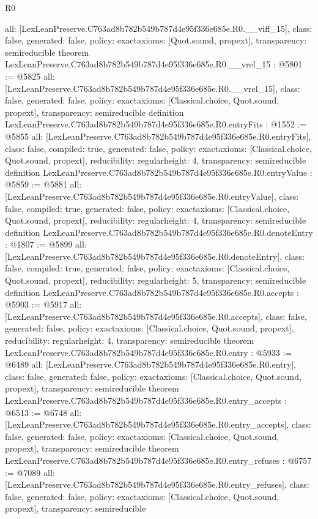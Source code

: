 \begin{lexlean}{R0}
\begin{coremodule}
{  all: [LexLeanPreserve.C763ad8b782b549b787d4e95f336e685e.R0.__viff_15],
  class: false,
  generated: false,
  policy: exact{axioms: [Quot.sound, propext]},
  transparency: semireducible
}
theorem LexLeanPreserve.C763ad8b782b549b787d4e95f336e685e.R0.__vrel_15 : @5801 := @5825 {
  all: [LexLeanPreserve.C763ad8b782b549b787d4e95f336e685e.R0.__vrel_15],
  class: false,
  generated: false,
  policy: exact{axioms: [Classical.choice, Quot.sound, propext]},
  transparency: semireducible
}
definition LexLeanPreserve.C763ad8b782b549b787d4e95f336e685e.R0.entryFits : @1552 := @5855 {
  all: [LexLeanPreserve.C763ad8b782b549b787d4e95f336e685e.R0.entryFits],
  class: false,
  compiled: true,
  generated: false,
  policy: exact{axioms: [Classical.choice, Quot.sound, propext]},
  reducibility: regular{height: 4},
  transparency: semireducible
}
definition LexLeanPreserve.C763ad8b782b549b787d4e95f336e685e.R0.entryValue : @5859 := @5881 {
  all: [LexLeanPreserve.C763ad8b782b549b787d4e95f336e685e.R0.entryValue],
  class: false,
  compiled: true,
  generated: false,
  policy: exact{axioms: [Classical.choice, Quot.sound, propext]},
  reducibility: regular{height: 4},
  transparency: semireducible
}
definition LexLeanPreserve.C763ad8b782b549b787d4e95f336e685e.R0.denoteEntry : @1807 := @5899 {
  all: [LexLeanPreserve.C763ad8b782b549b787d4e95f336e685e.R0.denoteEntry],
  class: false,
  compiled: true,
  generated: false,
  policy: exact{axioms: [Classical.choice, Quot.sound, propext]},
  reducibility: regular{height: 5},
  transparency: semireducible
}
definition LexLeanPreserve.C763ad8b782b549b787d4e95f336e685e.R0.accepts : @5903 := @5917 {
  all: [LexLeanPreserve.C763ad8b782b549b787d4e95f336e685e.R0.accepts],
  class: false,
  generated: false,
  policy: exact{axioms: [Classical.choice, Quot.sound, propext]},
  reducibility: regular{height: 4},
  transparency: semireducible
}
theorem LexLeanPreserve.C763ad8b782b549b787d4e95f336e685e.R0.entry : @5933 := @6489 {
  all: [LexLeanPreserve.C763ad8b782b549b787d4e95f336e685e.R0.entry],
  class: false,
  generated: false,
  policy: exact{axioms: [Classical.choice, Quot.sound, propext]},
  transparency: semireducible
}
theorem LexLeanPreserve.C763ad8b782b549b787d4e95f336e685e.R0.entry_accepts : @6513 := @6748 {
  all: [LexLeanPreserve.C763ad8b782b549b787d4e95f336e685e.R0.entry_accepts],
  class: false,
  generated: false,
  policy: exact{axioms: [Classical.choice, Quot.sound, propext]},
  transparency: semireducible
}
theorem LexLeanPreserve.C763ad8b782b549b787d4e95f336e685e.R0.entry_refuses : @6757 := @7089 {
  all: [LexLeanPreserve.C763ad8b782b549b787d4e95f336e685e.R0.entry_refuses],
  class: false,
  generated: false,
  policy: exact{axioms: [Classical.choice, Quot.sound, propext]},
  transparency: semireducible
}


\end{coremodule}
\end{lexlean}
